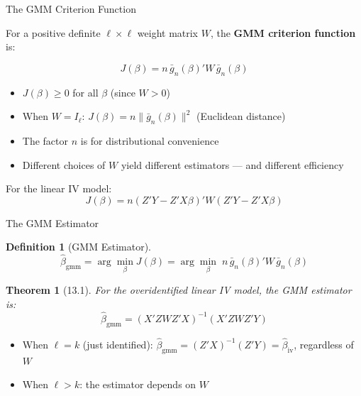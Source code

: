 \documentclass[aspectratio=169, handout, t]{beamer}
\newtheorem{thm}{Theorem}
\newtheorem{defn}{Definition}
\numberwithin{equation}{section}
\begin{document}
\begin{frame}{The GMM Criterion Function}

For a positive definite $\ell \times \ell$ weight matrix $W$, the \textbf{GMM criterion function} is:

$$\boxed{J(\beta) = n\,\bar{g}_n(\beta)' W\, \bar{g}_n(\beta)}$$

\medskip
\begin{itemize}
\item $J(\beta) \geq 0$ for all $\beta$ (since $W > 0$)
\item When $W = I_\ell$: $J(\beta) = n\|\bar{g}_n(\beta)\|^2$ (Euclidean distance)
\item The factor $n$ is for distributional convenience
\item \alert{Different choices of $W$ yield different estimators} --- and different efficiency
\end{itemize}

\smallskip
For the linear IV model:
$$J(\beta) = n(Z'Y - Z'X\beta)' W (Z'Y - Z'X\beta)$$

\end{frame}

\begin{frame}{The GMM Estimator}

\begin{defn}[GMM Estimator]
$$\hat\beta_{\text{gmm}} = \arg\min_\beta J(\beta) = \arg\min_\beta\; n\,\bar{g}_n(\beta)' W\, \bar{g}_n(\beta)$$
\end{defn}

\bigskip
\begin{thm}[13.1]
For the overidentified linear IV model, the GMM estimator is:
$$\hat\beta_{\text{gmm}} = (X'ZWZ'X)^{-1}(X'ZWZ'Y)$$
\end{thm}

\bigskip
\begin{itemize}
\item When $\ell = k$ (just identified): $\hat\beta_{\text{gmm}} = (Z'X)^{-1}(Z'Y) = \hat\beta_{\text{iv}}$, regardless of $W$
\item When $\ell > k$: the estimator \alert{depends on $W$}
\end{itemize}

\end{frame}
\end{document}
